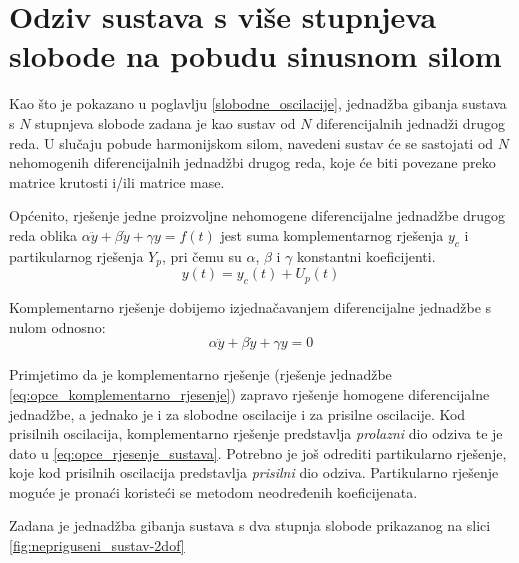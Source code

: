\section{Odziv sustava s više stupnjeva slobode na pobudu sinusnom
silom}\label{mdof_prisilne}
Kao što je pokazano u poglavlju \ref{slobodne_oscilacije}, jednadžba gibanja sustava
s $N$ stupnjeva slobode zadana je kao sustav od $N$ diferencijalnih jednadži drugog
reda. U slučaju pobude harmonijskom silom, navedeni sustav će se sastojati od $N$
nehomogenih diferencijalnih jednadžbi drugog reda, koje će biti povezane preko
matrice krutosti i/ili matrice mase. 
\par
Općenito, rješenje jedne proizvoljne nehomogene diferencijalne jednadžbe drugog reda
oblika $\alpha\ddot{y}+\beta\dot{y}+\gamma y= f(t)$ jest suma komplementarnog
rješenja $y_c$ i partikularnog rješenja $Y_p$, pri čemu su $\alpha$, $\beta$ i
$\gamma$ konstantni koeficijenti.
\begin{equation}
    y(t)=y_c(t)+U_p(t)
\end{equation}

Komplementarno rješenje dobijemo izjednačavanjem diferencijalne jednadžbe s nulom
odnosno:
\begin{equation}\label{eq:opce_komplementarno_rjesenje}
    \alpha\ddot{y}+\beta\dot{y}+\gamma y=0
\end{equation}

Primjetimo da je komplementarno rješenje (rješenje jednadžbe \eqref{eq:opce_komplementarno_rjesenje}) 
zapravo rješenje homogene diferencijalne jednadžbe, a jednako je i za slobodne 
oscilacije i za prisilne oscilacije. Kod prisilnih oscilacija, komplementarno 
rješenje predstavlja \textit{prolazni} dio odziva te je dato u \eqref{eq:opce_rjesenje_sustava}. 
Potrebno je još odrediti partikularno rješenje, koje kod prisilnih oscilacija
predstavlja \textit{prisilni} dio odziva. Partikularno rješenje moguće je pronaći
koristeći se metodom neodređenih koeficijenata. 
\par

Zadana je jednadžba gibanja sustava s dva stupnja slobode prikazanog na slici
\ref{fig:nepriguseni_sustav-2dof}

